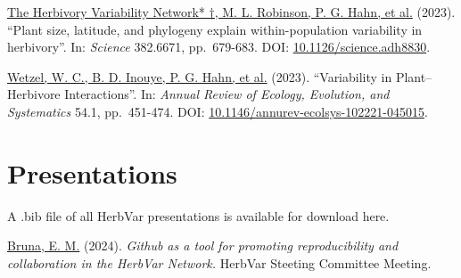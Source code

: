 \documentclass[
  letterpaper,
  DIV=11,
  numbers=noendperiod]{scrreprt}
\begin{document}
\hyperref[cite-the_herbivory_variability_network__plant_2023]{The
Herbivory Variability Network* †, M. L. Robinson, P. G. Hahn, et al.}
(2023). ``Plant size, latitude, and phylogeny explain within-population
variability in herbivory''. In: \emph{Science} 382.6671, pp.~679-683.
DOI:
\href{https://doi.org/10.1126\%2Fscience.adh8830}{10.1126/science.adh8830}.

\hyperref[cite-wetzel_variability_2023]{Wetzel, W. C., B. D. Inouye, P.
G. Hahn, et al.} (2023). ``Variability in Plant--Herbivore
Interactions''. In: \emph{Annual Review of Ecology, Evolution, and
Systematics} 54.1, pp.~451-474. DOI:
\href{https://doi.org/10.1146\%2Fannurev-ecolsys-102221-045015}{10.1146/annurev-ecolsys-102221-045015}.

\chapter*{Presentations}\label{presentations}


A .bib file of all HerbVar presentations is available for download here.

\hyperref[cite-bruna_github_2024]{Bruna, E. M.} (2024). \emph{Github as
a tool for promoting reproducibility and collaboration in the HerbVar
Network.} HerbVar Steeting Committee Meeting.
\end{document}
